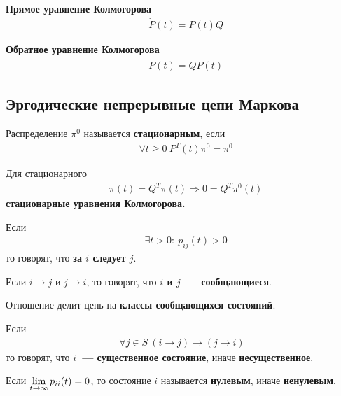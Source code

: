 \newpage
{}
\begin{Def}
    \textbf{Прямое уравнение Колмогорова}
    \begin{align*}
      & \dot{P}(t) = P(t)Q
    \end{align*}
\end{Def}
\begin{Def}
    \textbf{Обратное уравнение Колмогорова}
    \begin{align*}
      & \dot{P}(t) = QP(t)
    \end{align*}
\end{Def}
\subsection{Эргодические непрерывные цепи Маркова}
\begin{Def}
    Распределение $\pi^0$ называется \textbf{стационарным}, если
    \begin{align*}
      & \forall t \geq 0 \ P^T(t)\pi^0 = \pi^0
    \end{align*}
\end{Def}
\begin{Def}
    Для стационарного
    \begin{align*}
      & \dot{\pi}(t) = Q^T\pi(t) \Rightarrow 0 = Q^T\pi^0(t)
    \end{align*}
    \textbf{стационарные уравнения Колмогорова.}
\end{Def}
\begin{Def}
    Если
    \begin{align*}
      & \exists t > 0: \ p_{ij}(t) > 0
    \end{align*}
    то говорят, что \textbf{за $i$ следует $j$}.
\end{Def}
\begin{Def}
    Если $i \rightarrow j$ и $j \rightarrow i$, то говорят, что \textbf{$i$ и
      $j$~--- сообщающиеся}.
\end{Def}
Отношение делит цепь на \textbf{классы сообщающихся состояний}.
\begin{Def}
    Если
    \begin{align*}
      \forall j \in S \ (i \rightarrow j) \rightarrow (j \rightarrow i)
    \end{align*}
    то говорят, что \textbf{$i$~--- существенное состояние}, иначе
    \textbf{несущественное}.
\end{Def}
\begin{Def}
    Если $\displaystyle \lim_{t \to \infty} p_{ii}(t) = 0$, то состояние $i$ называется
    \textbf{нулевым}, иначе \textbf{ненулевым}.
\end{Def}
